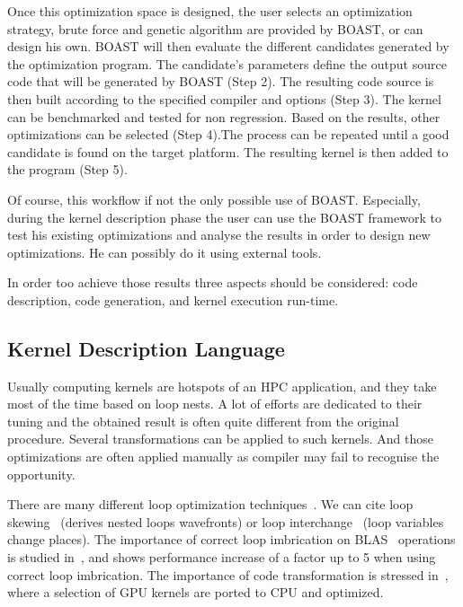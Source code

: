 \documentclass{IEEEtran}
\newcommand{\FD}[2]{\todo[inline, size=\small]{\textbf{FD$\rightarrow$#1}: #2.}}
\begin{document}
Once this optimization space is designed, the user selects an optimization
strategy, brute force and genetic algorithm are provided by BOAST, or can
design his own. BOAST will then evaluate the different candidates generated by
the optimization program. The candidate's parameters define the output source
code that will be generated by BOAST (Step 2). The resulting code source is
then built according to the specified compiler and options (Step 3). The kernel
can be benchmarked and tested for non regression. Based on the results, other
optimizations can be selected (Step 4).The process can be repeated until a good
candidate is found on the target platform. The resulting kernel is then added
to the program (Step 5).

Of course, this workflow if not the only possible use of BOAST.  Especially,
during the kernel description phase the user can use the BOAST framework to
test his existing optimizations and analyse the results in order to design new
optimizations. He can possibly do it using external tools.

In order too achieve those results three aspects should be considered: code
description, code generation, and kernel execution run-time.

\subsection{Kernel Description Language}

Usually computing kernels are hotspots of an HPC application, and they take most
of the time based on loop nests. A lot of efforts are dedicated to their tuning
and the obtained result is often quite different from the original procedure.
Several transformations can be applied to such kernels. And those optimizations
are often applied manually as compiler may fail to recognise the opportunity.

There are many different loop optimization techniques~\cite{wolf1991loop}. We
can cite loop skewing~\cite{wolfe1986loops} (derives nested loops wavefronts)
or loop interchange~\cite{allen1984automatic} (loop variables change places).
The importance of  correct loop imbrication on BLAS~\cite{lawson1979basic} %
operations is studied in~\cite{soliman2009performance}, and shows performance
increase of a factor up to 5 when using correct loop imbrication. The
importance of code transformation is stressed in~\cite{ye2011porting}, where a
selection of GPU kernels are ported to CPU and optimized.
\end{document}
